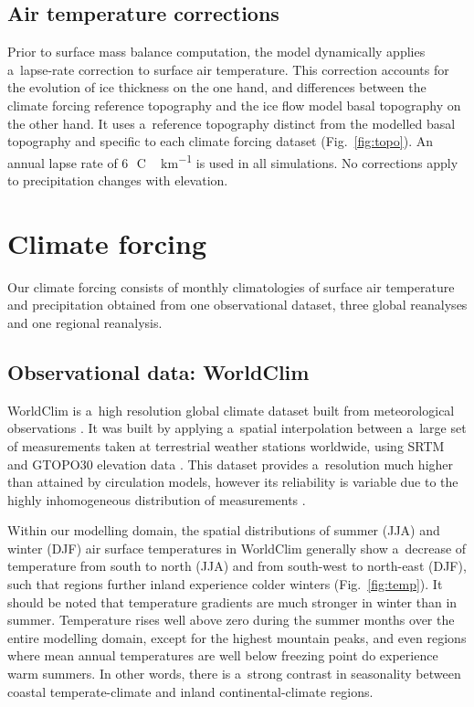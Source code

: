 \documentclass[tc, ms]{copernicus}
\begin{document}
\subsection{Air temperature corrections}

Prior to surface mass balance computation, the model dynamically applies a~lapse-rate correction to surface air temperature. This correction accounts for the evolution of ice thickness on the one hand, and differences between the climate forcing reference topography and the ice flow model basal topography on the other hand. It uses a~reference topography distinct from the modelled basal topography and specific to each climate forcing dataset (Fig.~\ref{fig:topo}). An annual lapse rate of 6\,\unit{{\degree}C\,km^{-1}} is used in all simulations. No corrections apply to precipitation changes with elevation.

\section{Climate forcing}
\label{sec:climate}

Our climate forcing consists of monthly climatologies of surface air temperature and precipitation obtained from one observational dataset, three global reanalyses and one regional reanalysis.

\subsection{Observational data: WorldClim}

WorldClim is a~high resolution global climate dataset built from meteorological observations \citep{data:worldclim}. It was built by applying a~spatial interpolation between a~large set of measurements taken at terrestrial weather stations worldwide, using SRTM \citep{data:srtm} and GTOPO30 elevation data \citep{data:gtopo30}. This dataset provides a~resolution much higher than attained by circulation models, however its reliability is variable due to the highly inhomogeneous distribution of measurements \citep{data:worldclim}.

Within our modelling domain, the spatial distributions of summer (JJA) and winter (DJF) air surface temperatures in WorldClim generally show a~decrease of temperature from south to north (JJA) and from south-west to north-east (DJF), such that regions further inland experience colder winters (Fig.~\ref{fig:temp}). It should be noted that temperature gradients are much stronger in winter than in summer. Temperature rises well above zero during the summer months over the entire modelling domain, except for the highest mountain peaks, and even regions where mean annual temperatures are well below freezing point do experience warm summers. In other words, there is a~strong contrast in seasonality between coastal temperate-climate and inland continental-climate regions.
\end{document}
